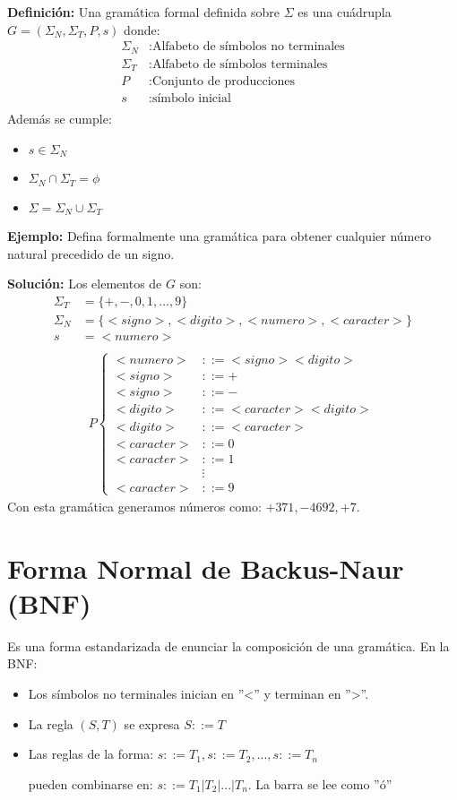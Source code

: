 \textbf{Definición: }Una gramática formal definida sobre $\Sigma$ es una cuádrupla $G=(\Sigma_N,\Sigma_T,P,s)$ donde:
\begin{align*}
\Sigma_N	&: \mbox{Alfabeto de símbolos no terminales}	\\
\Sigma_T	&: \mbox{Alfabeto de símbolos terminales}	\\
P			&: \mbox{Conjunto de producciones}	\\
s			&: \mbox{símbolo inicial}	\\
\end{align*}
Además se cumple:
\begin{itemize}
\item $s\in \Sigma_N$
\item $\Sigma_N \cap \Sigma_T=\phi$
\item $\Sigma=\Sigma_N\cup\Sigma_T$
\end{itemize}
\textbf{Ejemplo: }Defina formalmente una gramática para obtener cualquier número natural precedido de un signo.

\textbf{Solución: }Los elementos de $G$ son:
\begin{align*}
\Sigma_T	&=\{+,-,0,1,...,9\}	\\
\Sigma_N	&=\{<signo>,<digito>,<numero>,<caracter>\}	\\
s			&=<numero>	\\
\end{align*}
\begin{align*}
P\left \{ \begin{array}{rl}
<numero>	&::=<signo><digito>	\\  
<signo>		&::= +	\\
<signo>		&::= -	\\
<digito>	&::= <caracter><digito>	\\
<digito>	&::= <caracter>	\\
<caracter>	&::= 0	\\
<caracter>	&::= 1	\\
			&\vdots	\\
<caracter>	&::= 9	
\end{array}\right.
\end{align*}
Con esta gramática generamos números como: $+371,-4692,+7$.

\section{Forma Normal de Backus-Naur (BNF)}
Es una forma estandarizada de enunciar la composición de una gramática. En la BNF:
\begin{itemize}
\item Los símbolos no terminales inician en ''\textless'' y terminan en ''\textgreater''.
\item La regla $(S,T)$ se expresa $S::=T$
\item Las reglas de la forma:
	$s::=T_1, s::=T_2,...,s::=T_n$

pueden combinarse en: $s::=T_1|T_2|...|T_n$. La barra se lee como ''ó''
\end{itemize}

